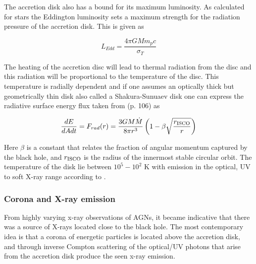 

The accretion disk also has a bound for its maximum luminosity. As calculated for stars the Eddington
luminosity sets a maximum strength for the radiation pressure of the accretion disk. This is given as



\begin{equation}
    L_{Edd} = \frac{4\pi G M m_p c}{\sigma_T}
    \label{eq:eddington_luminosity}
\end{equation}

The heating of the accretion disc will lead to thermal radiation from the disc and this radiation will be
proportional to the temperature of the disc. This temperature is radially dependent and if one assumes an optically thick but geometrically thin disk also called a Shakura-Sunuaev disk
one can express the radiative surface energy flux taken from \cite{BHradiation}(p. 106) as 

\begin{equation}
    \frac{dE}{dAdt}= F_{rad}(r) = \frac{3GM\dot{M}}{8\pi r^3}\left(1-\beta\sqrt{\frac{r_{\rm ISCO}}{r}}\right)
\end{equation}

Here $\beta$ is a constant that relates the fraction of angular momentum captured by the black hole, and $r_{\rm ISCO}$ is the radius of the innermost stable circular orbit. 
The temperature of the disk lie between $10^5 - 10^2$ K with emission in the optical, UV to soft X-ray range according to \cite{scholarpedia_accretion_discs}.


\subsubsection{Corona and X-ray emission}
From highly varying x-ray observations of AGNs, it became indicative that there was a source of X-rays located close to the black hole. 
The most contemporary idea is that a corona of energetic particles is located above the accretion disk, and through inverse Compton scattering
of the optical/UV photons that arise from the accretion disk produce the seen x-ray emission. 

